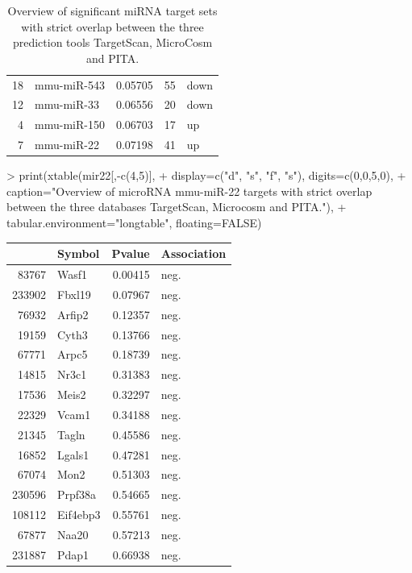 \documentclass{article}
\begin{document}
\begin{Schunk}
\begin{table}[ht]
\begin{center}
\begin{tabular}{rlrrl}
  18 & mmu-miR-543 & 0.05705 & 55 & down \\ 
  12 & mmu-miR-33 & 0.06556 & 20 & down \\ 
  4 & mmu-miR-150 & 0.06703 & 17 & up \\ 
  7 & mmu-miR-22 & 0.07198 & 41 & up \\ 
   \hline
\end{tabular}
\caption{Overview of significant miRNA target sets with strict overlap between the three prediction tools TargetScan, MicroCosm and PITA.}
\end{center}
\end{table}\end{Schunk}



\begin{Schunk}
\begin{Sinput}
> print(xtable(mir22[,-c(4,5)],
+        display=c("d", "s", "f", "s"), digits=c(0,0,5,0),
+        caption="Overview of microRNA mmu-miR-22 targets with strict overlap between the three databases TargetScan, Microcosm and PITA."),
+        tabular.environment="longtable", floating=FALSE)
\end{Sinput}
\begin{longtable}{rlrl}
  \hline
 & Symbol & Pvalue & Association \\ 
  \hline
83767 & Wasf1 & 0.00415 & neg. \\ 
  233902 & Fbxl19 & 0.07967 & neg. \\ 
  76932 & Arfip2 & 0.12357 & neg. \\ 
  19159 & Cyth3 & 0.13766 & neg. \\ 
  67771 & Arpc5 & 0.18739 & neg. \\ 
  14815 & Nr3c1 & 0.31383 & neg. \\ 
  17536 & Meis2 & 0.32297 & neg. \\ 
  22329 & Vcam1 & 0.34188 & neg. \\ 
  21345 & Tagln & 0.45586 & neg. \\ 
  16852 & Lgals1 & 0.47281 & neg. \\ 
  67074 & Mon2 & 0.51303 & neg. \\ 
  230596 & Prpf38a & 0.54665 & neg. \\ 
  108112 & Eif4ebp3 & 0.55761 & neg. \\ 
  67877 & Naa20 & 0.57213 & neg. \\ 
  231887 & Pdap1 & 0.66938 & neg. \\ 

\end{longtable}
\end{Schunk}
\end{document}
